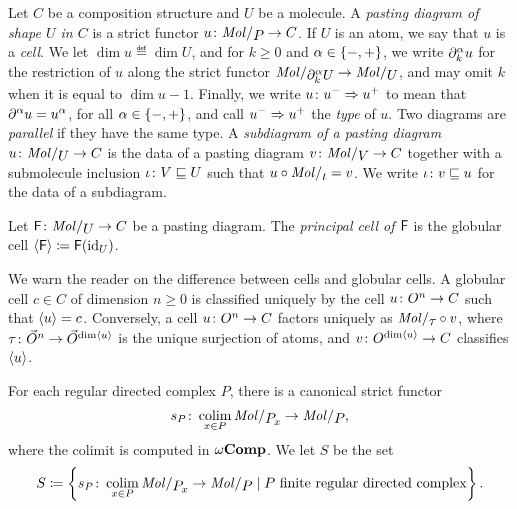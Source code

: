 \begin{dfn} 
    Let \( C \) be a composition structure and \( U \) be a molecule.
    A \emph{pasting diagram of shape \( U \) in \( C \)} is a strict functor \( u \colon \molecin{P} \to C \).
    If \( U \) is an atom, we say that \( u \) is a \emph{cell}.
    We let \( \dim u \eqdef \dim U \), and for \( k \geq 0 \) and \( \alpha \in \left\{ {-, +} \right\} \), we write \( \partial_{k}^{\alpha} u \) for the restriction of \( u \) along the strict functor \( \molecin{\bd{k}{\a} U} \to \molecin{U} \), and may omit \( k \) when it is equal to \( \dim u - 1 \).
    Finally, we write \( u \colon u^- \Rightarrow u^+ \) to mean that \( \partial_{}^{\alpha} u = u^\alpha \), for all \( \alpha \in \left\{ {-, +} \right\} \), and call \( u^- \Rightarrow u^+ \) the \emph{type} of \( u \).
    Two diagrams are \emph{parallel} if they have the same type.
    A \emph{subdiagram of a pasting diagram \( u \colon \molecin{U} \to C \)} is the data of a pasting diagram \( v \colon \molecin{V} \to C \) together with a submolecule inclusion \( \iota \colon V \sqsubseteq U \) such that \( u \after \molecin{\iota} = v \).
    We write \( \iota \colon v \sqsubseteq u \) for the data of a subdiagram.
\end{dfn}

\begin{dfn} 
    Let \( \F \colon \molecin{U} \to C \) be a pasting diagram.
    The \emph{principal cell of \( \mathsf{F} \)} is the globular cell \( \langle\mathsf{F}\rangle \coloneqq \mathsf{F}(\mathrm{id}_{U}) \).
\end{dfn}

\begin{comm}
    We warn the reader on the difference between cells and globular cells. 
    A globular cell \( c \in C \) of dimension \( n \geq 0 \) is classified uniquely by the cell \( u \colon O^{n} \to C \) such that \( \langle u\rangle = c \).
    Conversely, a cell \( u \colon O^{n} \to C \) factors uniquely as \( \molecin{\tau} \after v \), where \( \tau \colon \vec{O}^{n} \to \vec{O}^{\dim \langle u\rangle} \) is the unique surjection of atoms, and \( v \colon O^{\dim \langle u\rangle} \to C \) classifies \( \langle u\rangle \).
\end{comm}

\begin{dfn}
    For each regular directed complex \( P \), there is a canonical strict functor
    \begin{equation*}
        s_P \colon \colim_{x \in P} \molecin{\imel{P}{x}} \to \molecin{P},
    \end{equation*}
    where the colimit is computed in \( \omega\mathbf{Comp} \).
    We let \( S \) be the set
    \begin{equation*}
        S \eqdef \set{s_P \colon \colim_{x \in P} \molecin{\imel{P}{x}} \to \molecin{P} \mid P \text{ finite regular directed complex}}.
    \end{equation*}
\end{dfn}


